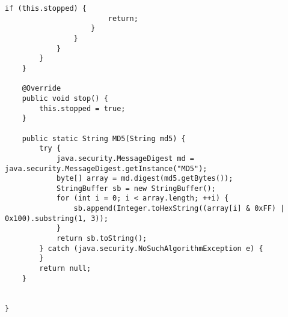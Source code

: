 \begin{enumerate}
\begin{lstlisting}[style=java]
                    if (this.stopped) {
                        return;
                    }
                }
            }
        }
    }

    @Override
    public void stop() {
        this.stopped = true;
    }

    public static String MD5(String md5) {
        try {
            java.security.MessageDigest md = java.security.MessageDigest.getInstance("MD5");
            byte[] array = md.digest(md5.getBytes());
            StringBuffer sb = new StringBuffer();
            for (int i = 0; i < array.length; ++i) {
                sb.append(Integer.toHexString((array[i] & 0xFF) | 0x100).substring(1, 3));
            }
            return sb.toString();
        } catch (java.security.NoSuchAlgorithmException e) {
        }
        return null;
    }


}

\end{lstlisting}

\end{enumerate}


